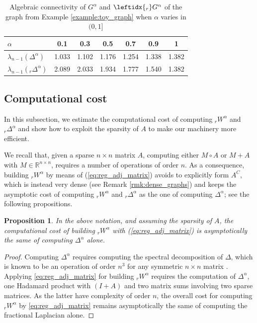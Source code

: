 \documentclass[a4paper,12pt]{article}
\newtheorem{proposition}{Proposition}
\newcommand{\R}{\mathbb{R}}
\newcommand{\fL}{\Delta^\alpha}
\newcommand{\rfL}{{}_r\fL}
\newcommand{\fW}{W^\alpha}
\newcommand{\rfW}{{}_r\fW}
\newcommand{\fG}{G^\alpha}
\newcommand{\rfG}{\leftidx{_r}\fG}
\begin{document}
    \begin{table}[t!]
    \centering
        \caption{Algebraic connectivity of $\fG$ and $\rfG$ of the graph from Example \ref{example:toy_graph} when $\alpha$ varies in $(0,1]$}
    \begin{tabular}{lcccccc}
    \toprule
 $\alpha$ & 0.1 & 0.3 & 0.5 & 0.7 & 0.9 &  1 \\
\midrule
$\lambda_{n-1}(\fL)$ & 1.033 & 1.102 & 1.176 & 1.254 & 1.338 &  1.382\\
$\lambda_{n-1}(\rfL)$& 2.089 &2.033 & 1.934 & 1.777 & 1.540  &  1.382 \\
\bottomrule
    \end{tabular}

    \label{tab:toy_graph_algebraic_connectivity_regularized}
\end{table}


\subsection{Computational cost} \label{subsec:cost_regularized}

In this subsection, we estimate the computational cost of computing $\rfW$ and $\rfL$ and show how to exploit the sparsity of $A$ to make our machinery more efficient.

 We recall that, given a sparse $n\times n$ matrix $A$, computing either $M\circ A$ or  $M+A$ with $M\in\R^{n \times n}$, requires a number of operations of order $n$. As a consequence, building $\rfW$ by means of (\ref{eq:reg_adj_matrix}) avoids to explicitly form $A^C$, which is instead very dense (see Remark \ref{rmk:dense_graphs}) and keeps the asymptotic cost of computing $\rfW$ and $\rfL$ as the one of computing $\fL$; see the following propositions.  

\begin{proposition} \label{prop:comp_cost} In the above notation, and assuming the sparsity of $A$, the computational cost of building $\rfW$ with (\ref{eq:reg_adj_matrix}) is asymptotically the same of computing $\fL$ alone.  
\end{proposition}
    \begin{proof} 
    Computing $\fL$ requires computing the spectral decomposition of $\Delta$, which is known to be an operation of order $n^3$ for any symmetric $n\times n$ matrix \cite{Golub_matrix_computation_4_ed}. Applying \eqref{eq:reg_adj_matrix} for building $\rfW$ requires the computation of $\fL$, one Hadamard product with $(I+A)$ and two matrix sums involving two sparse matrices. As the latter have complexity of order $n$, the overall cost for computing $\rfW$ by \eqref{eq:reg_adj_matrix} remains asymptotically the same of computing the fractional Laplacian alone.
    \end{proof}
\end{document}
